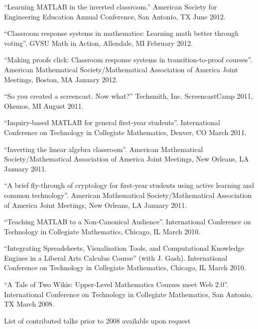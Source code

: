 \documentclass[letterpaper]{article}
\renewenvironment{itemize}{
  \begin{list}{}{
    \setlength{\leftmargin}{1.5em}
	\setlength{\itemsep}{0in}
  }
}{
  \end{list}
}
\begin{document}
\begin{itemize}
	\item ``Learning MATLAB in the inverted classroom.'' American Society for Engineering Education Annual Conference, San Antonio, TX June 2012. 
	\item ``Classroom response systems in mathematics: Learning math better through voting''. GVSU Math in Action, Allendale, MI February 2012. 
	\item ``Making proofs click: Classroom response systems in transition-to-proof courses''. American Mathematical Society/Mathematical Association of America Joint Meetings, Boston, MA January 2012. 
	\item ``So you created a screencast. Now what?'' Techsmith, Inc. ScreencastCamp 2011, Okemos, MI August 2011. 
	\item ``Inquiry-based MATLAB for general first-year students''. International Conference on Technology in Collegiate Mathematics, Denver, CO March 2011. 
	\item ``Inverting the linear algebra classroom''. American Mathematical Society/Mathematical Association of America Joint Meetings, New Orleans, LA January 2011.
	\item ``A brief fly-through of cryptology for first-year students using active learning and common technology''.   American Mathematical Society/Mathematical Association of America Joint Meetings, New Orleans, LA January 2011.
	\item ``Teaching MATLAB to a Non-Canonical Audience''. International Conference on Technology in Collegiate Mathematics, Chicago, IL March 2010. 
	\item ``Integrating Spreadsheets, Visualization Tools, and Computational Knowledge Engines in a Liberal Arts Calculus Course'' (with J. Gash). International Conference on Technology in Collegiate Mathematics, Chicago, IL March 2010.
	\item ``A Tale of Two Wikis: Upper-Level Mathematics Courses meet Web 2.0''. International Conference on Technology in Collegiate Mathematics, San Antonio, TX March 2008.
\end{itemize}

\begin{center}
  \begin{footnotesize}
    List of contributed talks prior to 2008 available upon request
  \end{footnotesize}
\end{center}
\end{document}
